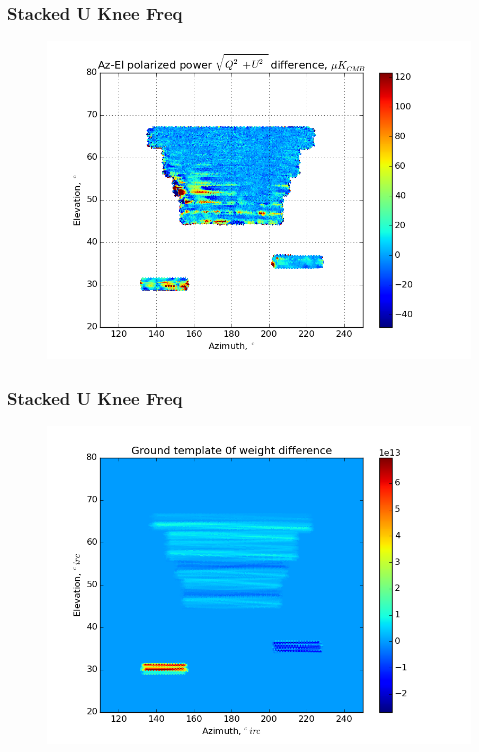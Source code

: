 \documentclass{beamer}
\begin{document}
\begin{frame}
\frametitle{Stacked U Knee Freq}
\begin{figure}
\includegraphics[width=0.9\linewidth]{dMag_gt_STACK_U_FKNEE.png}
\end{figure}
\end{frame}

\begin{frame}
\frametitle{Stacked U Knee Freq}
\begin{figure}
\includegraphics[width=0.9\linewidth]{dw0_gt_STACK_U_FKNEE.png}
\end{figure}
\end{frame}
\end{document}
